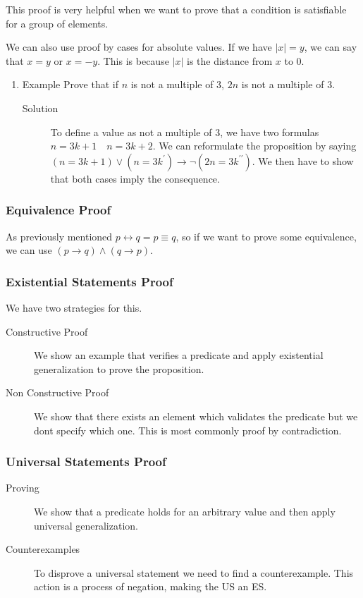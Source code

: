 \documentclass[11pt]{article}
\begin{document}
This proof is very helpful when we want to prove that a condition is satisfiable for a group of elements.

We can also use proof by cases for absolute values. If we have \(|x| = y\), we can say that \(x = y\) or \(x = -y\). This is because \(|x|\) is the distance from \(x\) to \(0\).

\begin{enumerate}
\item Example
\label{sec:orgc6bad79}
Prove that if \(n\) is not a multiple of 3, \(2n\) is not a multiple of 3.
\begin{description}
\item[{Solution}] To define a value as not a multiple of 3, we have two formulas \(n = 3k + 1 \quad n = 3k + 2\). We can reformulate the proposition by saying \((n = 3k+1) \lor (n = 3k^\prime) \to \neg (2n = 3k^{\prime\prime})\). We then have to show that both cases imply the consequence.
\end{description}
\end{enumerate}


\subsubsection{Equivalence Proof}
\label{sec:orgc00ea8f}
As previously mentioned \(p \leftrightarrow q = p \equiv q\), so if we want to prove some equivalence, we can use \((p \to q) \land (q \to p)\).
\subsubsection{Existential Statements Proof}
\label{sec:org1088e8e}
We have two strategies for this.
\begin{description}
\item[{Constructive Proof}] We show an example that verifies a predicate and apply existential generalization to prove the proposition.
\item[{Non Constructive Proof}] We show that there exists an element which validates the predicate but we dont specify which one. This is most commonly proof by contradiction.
\end{description}
\subsubsection{Universal Statements Proof}
\label{sec:orgc1b3e54}
\begin{description}
\item[{Proving}] We show that a predicate holds for an arbitrary value and then apply universal generalization.
\item[{Counterexamples}] To disprove a universal statement we need to find a counterexample. This action is a process of negation, making the US an ES.
\end{description}
\end{document}
